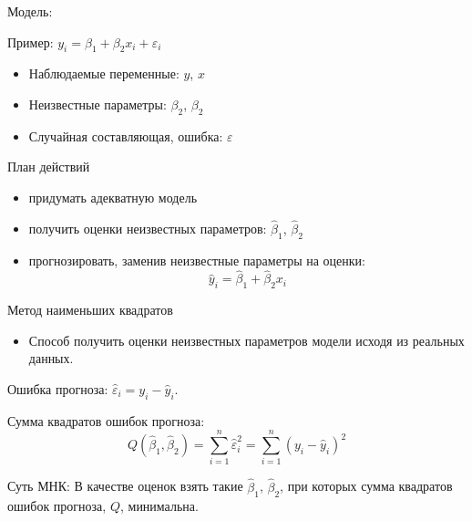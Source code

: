 \documentclass[russian,ignorenonframetext,]{beamer}
\providecommand{\tightlist}{%
  \setlength{\itemsep}{0pt}\setlength{\parskip}{0pt}}
\begin{document}
\begin{frame}{Модель:}

Пример: \(y_i=\beta_1 + \beta_2 x_i + \varepsilon_i\)

\begin{itemize}
\tightlist
\item
  Наблюдаемые переменные: \(y\), \(x\)
\item
  Неизвестные параметры: \(\beta_2\), \(\beta_2\)
\item
  Случайная составляющая, ошибка: \(\varepsilon\)
\end{itemize}

\begin{block}{План действий}

\begin{itemize}
\tightlist
\item
  придумать адекватную модель\\
\item
  получить оценки неизвестных параметров: \(\hat{\beta}_1\),
  \(\hat{\beta}_2\)\\
\item
  прогнозировать, заменив неизвестные параметры на оценки:\\
  \[
  \hat{y}_i=\hat{\beta}_1 + \hat{\beta}_2 x_i
  \]
\end{itemize}

\end{block}

\end{frame}

\begin{frame}{Метод наименьших квадратов}

\begin{itemize}
\tightlist
\item
  Способ получить оценки неизвестных параметров модели исходя из
  реальных данных.
\end{itemize}

Ошибка прогноза: \(\hat{\varepsilon}_i=y_i-\hat{y}_i\).

Сумма квадратов ошибок прогноза: \[
Q(\hat{\beta}_1,\hat{\beta}_2)=\sum_{i=1}^n \hat{\varepsilon}_i^2=\sum_{i=1}^n (y_i-\hat{y}_i)^2
\]

Суть МНК: В качестве оценок взять такие \(\hat{\beta}_1\),
\(\hat{\beta}_2\), при которых сумма квадратов ошибок прогноза, \(Q\),
минимальна.

\end{frame}
\end{document}
